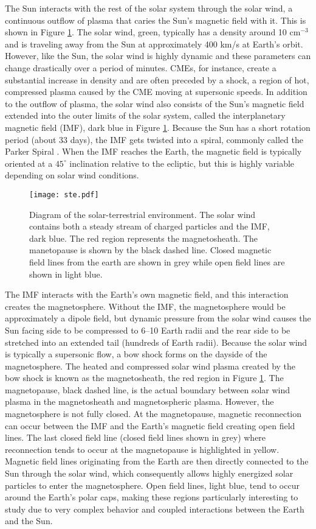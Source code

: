 The Sun interacts with the rest of the solar system through the solar wind, a continuous outflow of plasma that caries the Sun's magnetic field with it.  This is shown in Figure \ref{fig:ste}.  The solar wind, green, typically has a density around 10 cm\(^{-3}\) and is traveling away from the Sun at approximately 400 km/s at Earth's orbit.  However, like the Sun, the solar wind is highly dynamic and these parameters can change drastically over a period of minutes.  CMEs, for instance, create a substantial increase in density and are often preceded by a shock, a region of hot, compressed plasma caused by the CME moving at supersonic speeds.  In addition to the outflow of plasma, the solar wind also consists of the Sun's magnetic field extended into the outer limits of the solar system, called the interplanetary magnetic field (IMF), dark blue in Figure \ref{fig:ste}.  Because the Sun has a short rotation period (about 33 days), the IMF gets twisted into a spiral, commonly called the Parker Spiral \citep{Parker1958}.  When the IMF reaches the Earth, the magnetic field is typically oriented at a \(45^\circ\) inclination relative to the ecliptic, but this is highly variable depending on solar wind conditions.

\begin{figure}
	\texttt{[image: ste.pdf]}
	\caption{Diagram of the solar-terrestrial environment.  The solar wind contains both a steady stream of charged particles and the IMF, dark blue.  The red region represents the magnetosheath.  The manetopause is shown by the black dashed line.  Closed magnetic field lines from the earth are shown in grey while open field lines are shown in light blue.}
	\label{fig:ste}
\end{figure}

The IMF interacts with the Earth's own magnetic field, and this interaction creates the magnetosphere.  Without the IMF, the magnetosphere would be approximately a dipole field, but dynamic pressure from the solar wind causes the Sun facing side to be compressed to 6--10 Earth radii and the rear side to be stretched into an extended tail (hundreds of Earth radii).  Because the solar wind is typically a supersonic flow, a bow shock forms on the dayside of the magnetosphere.  The heated and compressed solar wind plasma created by the bow shock is known as the magnetosheath, the red region in Figure \ref{fig:ste}.  The magnetopause, black dashed line, is the actual boundary between solar wind plasma in the magnetosheath and magnetospheric plasma.  However, the magnetosphere is not fully closed.  At the magnetopause, magnetic reconnection can occur between the IMF and the Earth's magnetic field creating open field lines.  The last closed field line (closed field lines shown in grey) where reconnection tends to occur at the magnetopause is highlighted in yellow.  Magnetic field lines originating from the Earth are then directly connected to the Sun through the solar wind, which consequently allows highly energized solar particles to enter the magnetosphere.  Open field lines, light blue, tend to occur around the Earth's polar caps, making these regions particularly interesting to study due to very complex behavior and coupled interactions between the Earth and the Sun.

